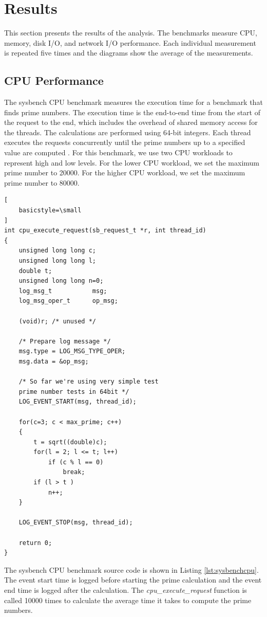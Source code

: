 \documentclass[11pt]{article}
\begin{document}
\section{Results}
This section presents the results of the analysis. The benchmarks measure CPU, memory, disk I/O, and network I/O performance. Each individual measurement is repeated five 
times and the diagrams show the average of the measurements. 

\subsection{CPU Performance}
The sysbench CPU benchmark measures the execution time for a benchmark that finds prime numbers. The execution time is the end-to-end time from the start of the request to the end, which includes the overhead of shared memory access for the threads. The calculations are performed using 64-bit integers. Each thread executes the requests concurrently until the prime numbers up to a specified value are computed \cite{kopytov}. For this benchmark, we use two CPU workloads to represent high and low levels. For the lower CPU workload, we set the maximum prime number to 20000. For the higher CPU workload, we set the maximum prime number to 80000. 

\lstset{caption=Sysbench CPU Benchmark Source Code, label=lst:sysbenchcpu}
\begin{lstlisting}[
	basicstyle=\small
]
int cpu_execute_request(sb_request_t *r, int thread_id)
{
	unsigned long long c;
	unsigned long long l;
	double t;
	unsigned long long n=0;
	log_msg_t           msg;
	log_msg_oper_t      op_msg;
	
	(void)r; /* unused */
	
	/* Prepare log message */
	msg.type = LOG_MSG_TYPE_OPER;
	msg.data = &op_msg;
	
	/* So far we're using very simple test 
	prime number tests in 64bit */
	LOG_EVENT_START(msg, thread_id);
	
	for(c=3; c < max_prime; c++)  
	{
		t = sqrt((double)c);
		for(l = 2; l <= t; l++)
			if (c % l == 0)
				break;
		if (l > t )
			n++; 
	}
	
	LOG_EVENT_STOP(msg, thread_id);
	
	return 0;
}
\end{lstlisting}

The sysbench CPU benchmark source code is shown in Listing \ref{lst:sysbenchcpu}. The event start time is logged before starting the prime calculation and the event end time is logged after the calculation. The \textit{cpu\_execute\_request} function is called 10000 times to calculate the average time it takes to compute the prime numbers. 
\end{document}
